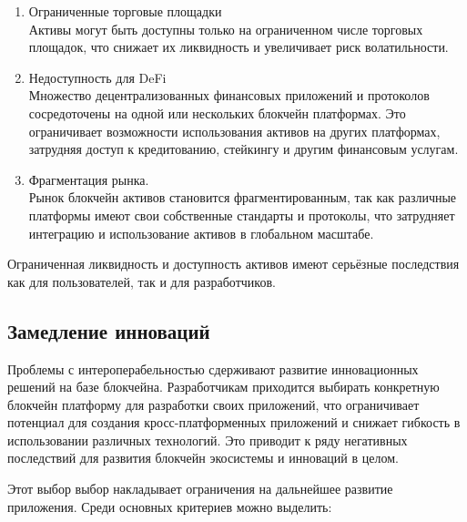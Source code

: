 \begin{enumerate}
	\item Ограниченные торговые площадки\\
	Активы могут быть доступны только на ограниченном числе торговых площадок, что снижает их ликвидность и увеличивает риск волатильности.

	\item Недоступность для DeFi\\
	Множество децентрализованных финансовых приложений и протоколов сосредоточены на одной или нескольких блокчейн платформах. Это ограничивает возможности использования активов на других платформах, затрудняя доступ к кредитованию, стейкингу и другим финансовым услугам.

	\item Фрагментация рынка.\\
	Рынок блокчейн активов становится фрагментированным, так как различные платформы имеют свои собственные стандарты и протоколы, что затрудняет интеграцию и использование активов в глобальном масштабе.
\end{enumerate}

Ограниченная ликвидность и доступность активов имеют серьёзные последствия как для пользователей, так и для разработчиков.

\subsection{Замедление инноваций}

Проблемы с интероперабельностью сдерживают развитие инновационных решений на базе блокчейна. Разработчикам приходится выбирать конкретную блокчейн платформу для разработки своих приложений, что ограничивает потенциал для создания кросс-платформенных приложений и снижает гибкость в использовании различных технологий. Это приводит к ряду негативных последствий для развития блокчейн экосистемы и инноваций в целом.

Этот выбор выбор накладывает ограничения на дальнейшее развитие приложения. Среди основных критериев можно выделить:

